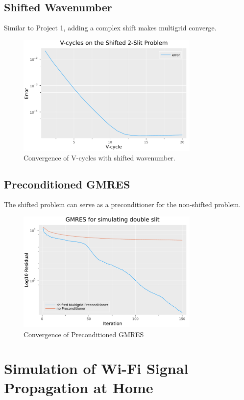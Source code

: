 \documentclass[a4paper,12pt]{article}
\begin{document}
\subsection{Shifted Wavenumber}
Similar to Project 1, adding a complex shift makes multigrid converge.
\begin{figure}[h!]
    \centering
    \includegraphics[width=0.8\textwidth]{../plots/Vcycles_shifted2slit.pdf}
    \caption{Convergence of V-cycles with shifted wavenumber.}
    \label{fig:../plots/Vcycles_shifted2slit.pdf}
\end{figure}

\subsection{Preconditioned GMRES}
The shifted problem can serve as a preconditioner for the non-shifted problem.
\begin{figure}[h!]
    \centering
    \includegraphics[width=0.8\textwidth]{../plots/GMRES2slit.pdf}
    \caption{Convergence of Preconditioned GMRES}
    \label{fig:../plots/GMRES2slit.pdf}
\end{figure}

\section{Simulation of Wi-Fi Signal Propagation at Home}
\end{document}
